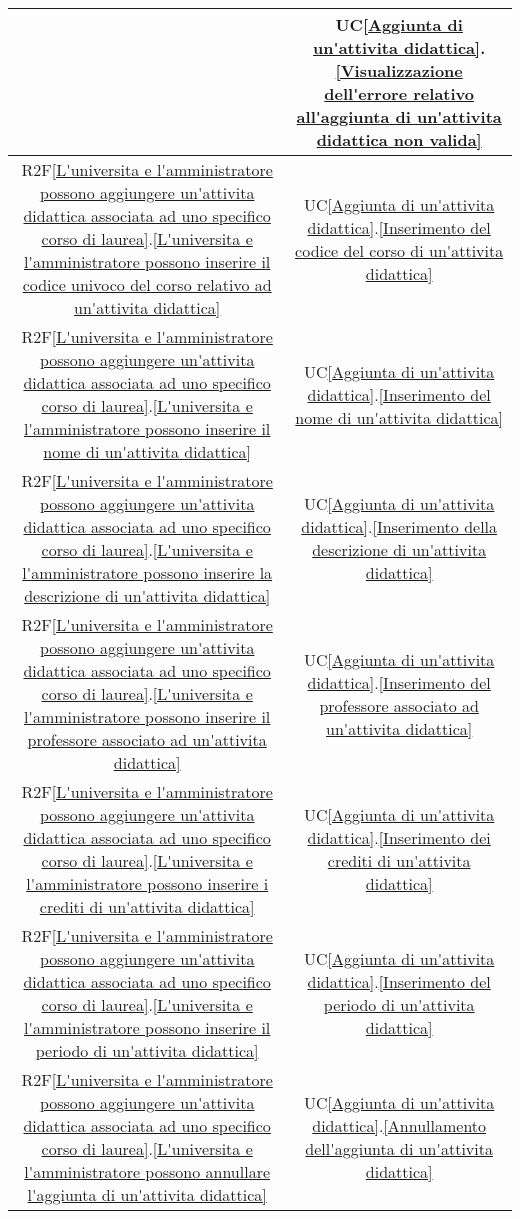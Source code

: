 \begin{longtable}{|c|c|}
& UC\ref{Aggiunta di un'attivita didattica}.\ref{Visualizzazione dell'errore relativo all'aggiunta di un'attivita didattica non valida}\\
\hline
R2F\ref{L'universita e l'amministratore possono aggiungere un'attivita didattica associata ad uno specifico corso di laurea}.\ref{L'universita e l'amministratore possono inserire il codice univoco del corso relativo ad un'attivita didattica} & UC\ref{Aggiunta di un'attivita didattica}.\ref{Inserimento del codice del corso di un'attivita didattica}\\
\hline
R2F\ref{L'universita e l'amministratore possono aggiungere un'attivita didattica associata ad uno specifico corso di laurea}.\ref{L'universita e l'amministratore possono inserire il nome di un'attivita didattica} & UC\ref{Aggiunta di un'attivita didattica}.\ref{Inserimento del nome di un'attivita didattica}\\
\hline
R2F\ref{L'universita e l'amministratore possono aggiungere un'attivita didattica associata ad uno specifico corso di laurea}.\ref{L'universita e l'amministratore possono inserire la descrizione di un'attivita didattica} & UC\ref{Aggiunta di un'attivita didattica}.\ref{Inserimento della descrizione di un'attivita didattica}\\
\hline
R2F\ref{L'universita e l'amministratore possono aggiungere un'attivita didattica associata ad uno specifico corso di laurea}.\ref{L'universita e l'amministratore possono inserire il professore associato ad un'attivita didattica} & UC\ref{Aggiunta di un'attivita didattica}.\ref{Inserimento del professore associato ad un'attivita didattica}\\
\hline
R2F\ref{L'universita e l'amministratore possono aggiungere un'attivita didattica associata ad uno specifico corso di laurea}.\ref{L'universita e l'amministratore possono inserire i crediti di un'attivita didattica} & UC\ref{Aggiunta di un'attivita didattica}.\ref{Inserimento dei crediti di un'attivita didattica}\\
\hline
R2F\ref{L'universita e l'amministratore possono aggiungere un'attivita didattica associata ad uno specifico corso di laurea}.\ref{L'universita e l'amministratore possono inserire il periodo di un'attivita didattica} & UC\ref{Aggiunta di un'attivita didattica}.\ref{Inserimento del periodo di un'attivita didattica}\\
\hline
R2F\ref{L'universita e l'amministratore possono aggiungere un'attivita didattica associata ad uno specifico corso di laurea}.\ref{L'universita e l'amministratore possono annullare l'aggiunta di un'attivita didattica} & UC\ref{Aggiunta di un'attivita didattica}.\ref{Annullamento dell'aggiunta di un'attivita didattica}\\

\end{longtable}
